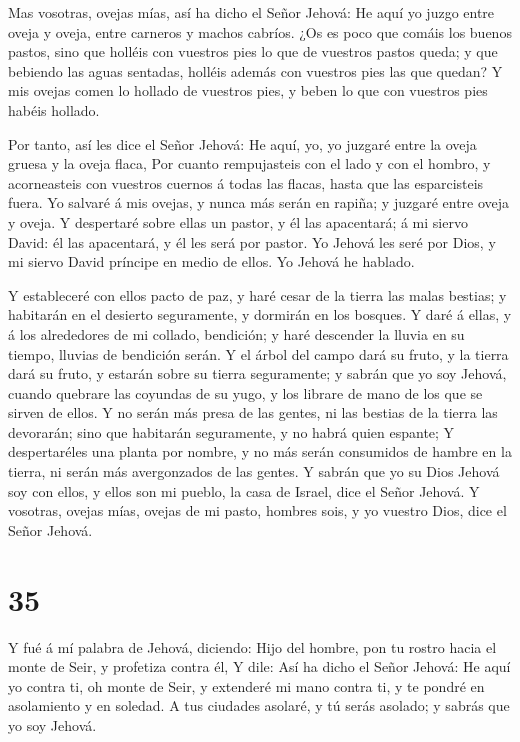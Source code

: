  Mas vosotras, ovejas mías, así ha dicho el Señor Jehová:
He aquí yo juzgo entre oveja y oveja, entre carneros y machos cabríos.
 ¿Os es poco que comáis los buenos pastos, sino que holléis
con vuestros pies lo que de vuestros pastos queda; y que bebiendo las
aguas sentadas, holléis además con vuestros pies las que quedan?
 Y mis ovejas comen lo hollado de vuestros pies, y beben lo
que con vuestros pies habéis hollado.

 Por tanto, así les dice el Señor Jehová: He aquí, yo, yo
juzgaré entre la oveja gruesa y la oveja flaca,  Por cuanto
rempujasteis con el lado y con el hombro, y acorneasteis con vuestros
cuernos á todas las flacas, hasta que las esparcisteis fuera.
 Yo salvaré á mis ovejas, y nunca más serán en rapiña; y
juzgaré entre oveja y oveja.  Y despertaré sobre ellas un
pastor, y él las apacentará; á mi siervo David: él las apacentará, y él
les será por pastor.  Yo Jehová les seré por Dios, y mi
siervo David príncipe en medio de ellos. Yo Jehová he hablado.

 Y estableceré con ellos pacto de paz, y haré cesar de la
tierra las malas bestias; y habitarán en el desierto seguramente, y
dormirán en los bosques.  Y daré á ellas, y á los
alrededores de mi collado, bendición; y haré descender la lluvia en su
tiempo, lluvias de bendición serán.  Y el árbol del campo
dará su fruto, y la tierra dará su fruto, y estarán sobre su tierra
seguramente; y sabrán que yo soy Jehová, cuando quebrare las coyundas de
su yugo, y los librare de mano de los que se sirven de ellos.
 Y no serán más presa de las gentes, ni las bestias de la
tierra las devorarán; sino que habitarán seguramente, y no habrá quien
espante;  Y despertaréles una planta por nombre, y no más
serán consumidos de hambre en la tierra, ni serán más avergonzados de
las gentes.  Y sabrán que yo su Dios Jehová soy con ellos,
y ellos son mi pueblo, la casa de Israel, dice el Señor Jehová.
 Y vosotras, ovejas mías, ovejas de mi pasto, hombres sois,
y yo vuestro Dios, dice el Señor Jehová.

\hypertarget{section-34}{%
\section{35}\label{section-34}}

 Y fué á mí palabra de Jehová, diciendo:  Hijo
del hombre, pon tu rostro hacia el monte de Seir, y profetiza contra él,
 Y dile: Así ha dicho el Señor Jehová: He aquí yo contra ti,
oh monte de Seir, y extenderé mi mano contra ti, y te pondré en
asolamiento y en soledad.  A tus ciudades asolaré, y tú
serás asolado; y sabrás que yo soy Jehová.

